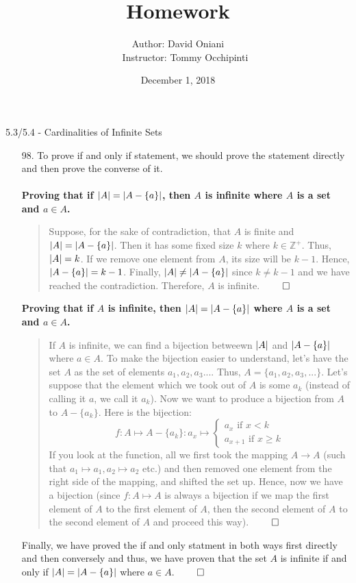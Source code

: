 \documentclass[12pt, a4paper]{article}
\title{\bf{Homework \textnumero 14}}
\author{Author: David Oniani
\\
\ \ \ Instructor: Tommy Occhipinti}
\date{December 1, 2018}
\newcommand{\pints}{\mathbb{Z}^+}
\DeclarePairedDelimiter\abs{\lvert}{\rvert}
\newcommand{\rarr}{\rightarrow}
\begin{document}
\maketitle
{\Large 5.3/5.4 - Cardinalities of Infinite Sets}
\begin{itemize}
\item[]

\item[98.]
To prove if and only if statement, we should prove the statement directly and then prove the converse of it.\\\\
\textbf{Proving that if $\abs{A} = \abs{A - \{a\}}$, then $A$ is infinite where $A$ is a set and $a \in A$.}
\begin{quote}
Suppose, for the sake of contradiction, that $A$ is finite and $\abs{A} = \abs{A - \{a\}}$. Then it has some fixed size $k$ where $k \in \pints$. Thus, $\abs{A} = k$.
If we remove one element from $A$, its size will be $k - 1$. Hence, $\abs{A - \{a\}} = k - 1$. Finally, $\abs{A} \neq \abs{A - \{a\}}$
since $k \neq k - 1$ and we have reached the contradiction. Therefore, $A$ is infinite.
$\qed$
\end{quote}
\item[]
\textbf{Proving that if $A$ is infinite, then $\abs{A} = \abs{A - \{a\}}$ where $A$ is a set and $a \in A$.}
\begin{quote}
If $A$ is infinite, we can find a bijection betweewn $\abs{A}$ and $\abs{A - \{a\}}$ where $a \in A$.
To make the bijection easier to understand, let's have the set $A$ as the set of elements $a_1, a_2, a_3 ...$.
Thus, $A = \{a_1, a_2, a_3, ...\}$. Let's suppose that the element which we took out of $A$ is some $a_k$ (instead of calling it $a$, we call it $a_k$).
Now we want to produce a bijection from $A$ to $A - \{a_k\}$.
Here is the bijection:
$$f : A \mapsto A - \{a_k\} : a_x \mapsto \begin{cases} a_x \mbox{ if $x < k$} \\ a_{x + 1} \mbox{ if $x \geq k$}\end{cases}$$
If you look at the function, all we first took the mapping $A \rarr A$ (such that $a_1 \mapsto a_1, a_2 \mapsto a_2$ etc.) and then removed one element from the right side of the mapping,
and shifted the set up. Hence, now we have a bijection (since $f : A \mapsto A$ is always a bijection if we map the first element of $A$
to the first element of $A$, then the second element of $A$ to the second element of $A$ and proceed this way).
$\qed$
\end{quote}
Finally, we have proved the if and only statment in both ways first directly and then conversely and thus, we have proven
that the set $A$ is infinite if and only if $\abs{A} = \abs{A - \{a\}}$ where $a \in A$.
$\qed$


\end{itemize}
\end{document}
